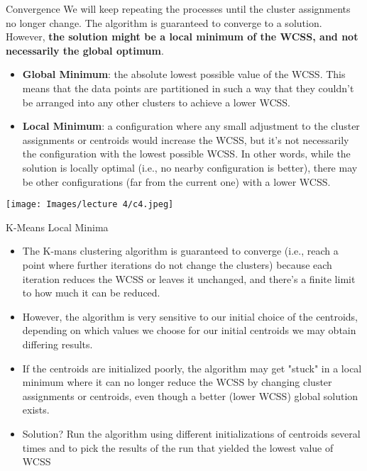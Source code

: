 \documentclass[xcolor=dvipsnames, 9pt]{beamer} %
\begin{document}
\begin{frame}{Convergence}
We will keep repeating the processes until the cluster assignments no longer change. The algorithm is guaranteed to converge to a solution. However, \textbf{the solution might be a local minimum of the WCSS, and not necessarily the global optimum}.
\begin{itemize}
    \item \textbf{Global Minimum}: the absolute lowest possible value of the WCSS. This means that the data points are partitioned in such a way that they couldn't be arranged into any other clusters to achieve a lower WCSS.
    \item \textbf{Local Minimum}: a configuration where any small adjustment to the cluster assignments or centroids would increase the WCSS, but it's not necessarily the configuration with the lowest possible WCSS. In other words, while the solution is locally optimal (i.e., no nearby configuration is better), there may be other configurations (far from the current one) with a lower WCSS.
\end{itemize}
\begin{center}
\texttt{[image: Images/lecture 4/c4.jpeg]} 
\end{center}
\end{frame}

\begin{frame}{K-Means Local Minima}
\begin{itemize}
    \item The K-mans clustering algorithm is guaranteed to converge (i.e., reach a point where further iterations do not change the clusters) because each iteration reduces the WCSS or leaves it unchanged, and there's a finite limit to how much it can be reduced.
    \item However, the algorithm is very sensitive to our initial choice of the centroids, depending on which values we choose for our initial centroids we may obtain differing results.
    \item If the centroids are initialized poorly, the algorithm may get "stuck" in a local minimum where it can no longer reduce the WCSS by changing cluster assignments or centroids, even though a better (lower WCSS) global solution exists. 
    \item Solution? Run the algorithm using different initializations of centroids several times and to pick the results of the run that yielded the lowest value of WCSS
\end{itemize}
\end{frame}
\end{document}
